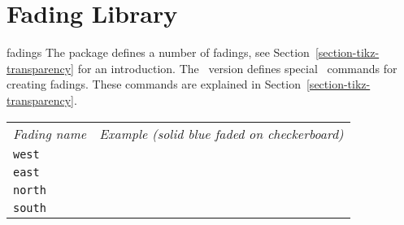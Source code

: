 %
%
%


\section{Fading Library}
\label{section-library-fadings}

\begin{pgflibrary}{fadings}
  The package defines a number of fadings, see
  Section~\ref{section-tikz-transparency} for an introduction.  The
  \tikzname\ version defines special \tikzname\ commands for creating
  fadings. These commands are explained in
  Section~\ref{section-tikz-transparency}.   
\end{pgflibrary}

\newcommand\fadingindex[1]{%
  \index{#1@\protect\texttt{#1} fading}%
  \index{Fadings!#1@\protect\texttt{#1}}%
  \texttt{#1}& 
  \begin{tikzpicture}[baseline=5mm-.5ex]
    \fill [black!20] (0,0) rectangle (1,1);
    \path [pattern=checkerboard,pattern color=black!30] (0,0) rectangle (1,1);

    \fill [path fading=#1,blue] (0,0) rectangle (1,1);
  \end{tikzpicture} \\[4.5mm]
}

\noindent
\begin{tabular}{ll}
  \emph{Fading name} & \emph{Example (solid blue faded on checkerboard)} \\[1mm]
  \fadingindex{west}  
  \fadingindex{east}  
  \fadingindex{north}  
  \fadingindex{south} 
\end{tabular}


